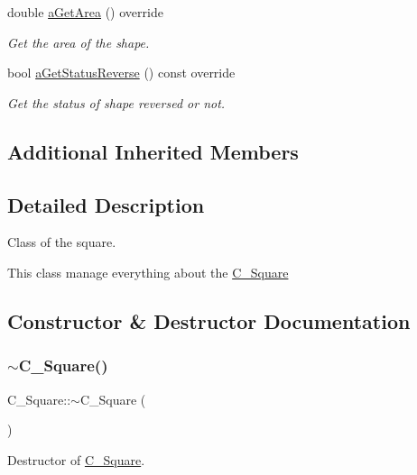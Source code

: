 \begin{DoxyCompactItemize}
double \hyperlink{classC__Square_affd2be59872618d5d1955be360fb73e6}{a\+Get\+Area} () override
\begin{DoxyCompactList}\small\item\em Get the area of the shape. \end{DoxyCompactList}\item 
bool \hyperlink{classC__Square_afe17127df3b112178973ad2182fe9204}{a\+Get\+Status\+Reverse} () const override
\begin{DoxyCompactList}\small\item\em Get the status of shape reversed or not. \end{DoxyCompactList}\end{DoxyCompactItemize}
\subsection*{Additional Inherited Members}


\subsection{Detailed Description}
Class of the square. 

This class manage everything about the \hyperlink{classC__Square}{C\+\_\+\+Square} 

\subsection{Constructor \& Destructor Documentation}
\mbox{\label{classC__Square_a8b63c0c06cdda3835b85c4a38692ac44}} 
\subsubsection{\texorpdfstring{$\sim$\+C\+\_\+\+Square()}{~C\_Square()}}
{\footnotesize\ttfamily C\+\_\+\+Square\+::$\sim$\+C\+\_\+\+Square (\begin{DoxyParamCaption}{ }\end{DoxyParamCaption})\hspace{0.3cm}{\ttfamily [override]}}



Destructor of \hyperlink{classC__Square}{C\+\_\+\+Square}. 

\mbox{\label{classC__Square_a3bec8a18c9b487b44585a38161cb6442}} 
